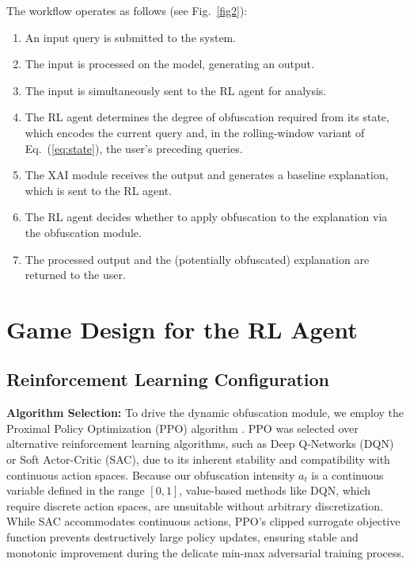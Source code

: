\documentclass[conference]{IEEEtran}
\DeclareRobustCommand{\revnew}[1]{{\color{revpurple}#1}}
\begin{document}
The workflow operates as follows (see Fig.~\ref{fig2}):
\begin{enumerate}
    \item An input query is submitted to the system.
    \item The input is processed on the model, generating an output.
    \item The input is simultaneously sent to the RL agent for analysis.
    \item \revnew{The RL agent determines the degree of obfuscation required from its state, which encodes the current query and, in the rolling-window variant of Eq.~(\ref{eq:state}), the user's preceding queries.}
    \item The XAI module receives the output and generates a baseline explanation, which is sent to the RL agent.
    \item The RL agent decides whether to apply obfuscation to the explanation via the obfuscation module.
    \item The processed output and the (potentially obfuscated) explanation are returned to the user.
\end{enumerate}

\section{Game Design for the RL Agent}
\subsection{Reinforcement Learning Configuration}
\label{sec:rlconfig}

\textbf{Algorithm Selection:}
To drive the dynamic obfuscation module, we employ the Proximal Policy Optimization (PPO) algorithm \cite{b23}. PPO was selected over alternative reinforcement learning algorithms, such as Deep Q-Networks (DQN) or Soft Actor-Critic (SAC), due to its inherent stability and compatibility with continuous action spaces. Because our obfuscation intensity $a_t$ is a continuous variable defined in the range $[0, 1]$, value-based methods like DQN, which require discrete action spaces, are unsuitable without arbitrary discretization. While SAC accommodates continuous actions, PPO's clipped surrogate objective function prevents destructively large policy updates, ensuring stable and monotonic improvement during the delicate min-max adversarial training process.
\end{document}

